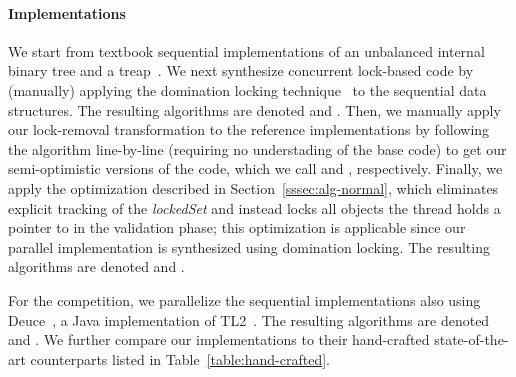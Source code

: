 
\paragraph{Implementations}
We start from textbook sequential implementations of an unbalanced internal binary
tree and a treap~\cite{AragonS1989}. We next  synthesize 
concurrent lock-based code by (manually) applying the domination locking technique~\cite{Gueta2011} to the sequential
data structures. The resulting algorithms are denoted \domTree and \domTreap.
Then, we manually apply our lock-removal transformation to the reference
implementations by following the algorithm line-by-line (requiring no understading of the base code)
to get our semi-optimistic versions of the code, which we call
\autoTree and \autoTreap, respectively. 
Finally, we apply the optimization described in Section~\ref{sssec:alg-normal}, which eliminates explicit tracking of the \emph{lockedSet} and instead locks 
all objects the thread holds a pointer to in the validation phase; this optimization is applicable since our parallel implementation is synthesized using
domination locking. The resulting algorithms are denoted \optAutoTree and \optAutoTreap.   

For the competition, we parallelize the sequential implementations also using 
Deuce~\cite{Deuce2010}, a Java implementation of  TL2~\cite{DiceSS2006}. The resulting algorithms are denoted \stmTree and \stmTreap. We further compare our implementations to their hand-crafted state-of-the-art counterparts
listed in Table~\ref{table:hand-crafted}.


